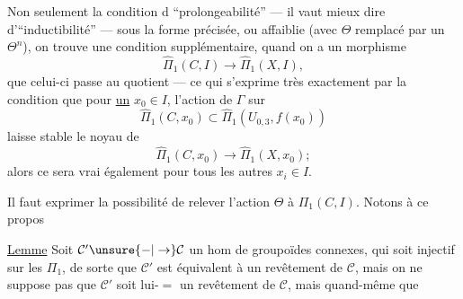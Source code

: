 Non seulement la condition d  ``prolongeabilité'' --- il vaut mieux dire d'``inductibilité'' --- sous la forme précisée, ou affaiblie (avec $\Theta$ remplacé par un $\Theta^n$), on trouve une condition supplémentaire, quand on a  un morphisme
\[
\widehat\Pi_1(C,I)\longrightarrow\widehat\Pi_1(X,I),
\]
que celui-ci passe au quotient --- ce qui s'exprime très exactement par la condition que pour \uline{un} $x_0\in I$, l'action de $\Gamma$ sur
\[
\widehat\Pi_1(C,x_0)\subset\widehat\Pi_1(U_{0,3},f(x_0))
\]
laisse stable le noyau de
\[
\widehat\Pi_1(C,x_0)\longrightarrow\widehat\Pi_1(X,x_0);
\]
alors ce sera vrai également pour tous les autres $x_i\in I$.

Il faut exprimer la possibilité de relever l'action  $\Theta$ à $\Pi_1(C,I)$. Notons à ce propos

\uline{Lemme} Soit $\mathcal C'\unsure{\mathbin{-}|\to}\mathcal C$ un hom de groupoïdes connexes, qui soit injectif sur les $\Pi_1$,  de sorte que $\mathcal C'$ est équivalent à un revêtement de $\mathcal C$, mais on ne suppose pas que $\mathcal C'$ soit lui-$=$ un revêtement de $\mathcal C$, mais quand-même que

